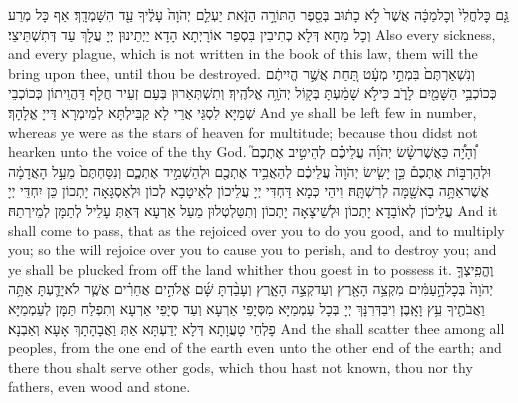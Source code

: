{גַּ֤ם כׇּל\maqqaf חֳלִי֙ וְכׇל\maqqaf מַכָּ֔ה אֲשֶׁר֙ לֹ֣א כָת֔וּב בְּסֵ֖פֶר הַתּוֹרָ֣ה הַזֹּ֑את יַעְלֵ֤ם יְהֹוָה֙ עָלֶ֔יךָ עַ֖ד הִשָּׁמְדָֽךְ׃}
{אַף כָּל מְרַע וְכָל מַחָא דְּלָא כְתִיבִין בִּסְפַר אוֹרָיְתָא הָדָא יַיְתֵינוּן יְיָ עֲלָךְ עַד דְּתִשְׁתֵּיצֵי׃}
{Also every sickness, and every plague, which is not written in the book of this law, them will the \lord\space bring upon thee, until thou be destroyed.}{}
{וְנִשְׁאַרְתֶּם֙ בִּמְתֵ֣י מְעָ֔ט תַּ֚חַת אֲשֶׁ֣ר הֱיִיתֶ֔ם כְּכוֹכְבֵ֥י הַשָּׁמַ֖יִם לָרֹ֑ב כִּי\maqqaf לֹ֣א שָׁמַ֔עְתָּ בְּק֖וֹל יְהֹוָ֥ה אֱלֹהֶֽיךָ׃}
{וְתִשְׁתְּאַרוּן בְּעַם זְעֵיר חֲלָף דַּהֲוֵיתוֹן כְּכוֹכְבֵי שְׁמַיָּא לִסְגֵּי אֲרֵי לָא קַבֵּילְתָּא לְמֵימְרָא דַּייָ אֱלָהָךְ׃}
{And ye shall be left few in number, whereas ye were as the stars of heaven for multitude; because thou didst not hearken unto the voice of the \lord\space thy God.}{}
{וְ֠הָיָ֠ה כַּאֲשֶׁר\maqqaf שָׂ֨שׂ יְהֹוָ֜ה עֲלֵיכֶ֗ם לְהֵיטִ֣יב אֶתְכֶם֮ וּלְהַרְבּ֣וֹת אֶתְכֶם֒ כֵּ֣ן יָשִׂ֤ישׂ יְהֹוָה֙ עֲלֵיכֶ֔ם לְהַאֲבִ֥יד אֶתְכֶ֖ם וּלְהַשְׁמִ֣יד אֶתְכֶ֑ם וְנִסַּחְתֶּם֙ מֵעַ֣ל הָאֲדָמָ֔ה אֲשֶׁר\maqqaf אַתָּ֥ה בָא\maqqaf שָׁ֖מָּה לְרִשְׁתָּֽהּ׃}
{וִיהֵי כְּמָא דַּחְדִּי יְיָ עֲלֵיכוֹן לְאֵיטָבָא לְכוֹן וּלְאַסְגָּאָה יָתְכוֹן כֵּן יִחְדֵּי יְיָ עֲלֵיכוֹן לְאוֹבָדָא יָתְכוֹן וּלְשֵׁיצָאָה יָתְכוֹן וְתִטַּלְטְלוּן מֵעַל אַרְעָא דְּאַתְּ עָלֵיל לְתַמָּן לְמֵירְתַהּ׃}
{And it shall come to pass, that as the \lord\space rejoiced over you to do you good, and to multiply you; so the \lord\space will rejoice over you to cause you to perish, and to destroy you; and ye shall be plucked from off the land whither thou goest in to possess it.}{}
{וֶהֱפִֽיצְךָ֤ יְהֹוָה֙ בְּכׇל\maqqaf הָ֣עַמִּ֔ים מִקְצֵ֥ה הָאָ֖רֶץ וְעַד\maqqaf קְצֵ֣ה הָאָ֑רֶץ וְעָבַ֨דְתָּ שָּׁ֜ם אֱלֹהִ֣ים אֲחֵרִ֗ים אֲשֶׁ֧ר לֹא\maqqaf יָדַ֛עְתָּ אַתָּ֥ה וַאֲבֹתֶ֖יךָ עֵ֥ץ וָאָֽבֶן׃}
{וִיבַדְּרִנָּךְ יְיָ בְּכָל עַמְמַיָּא מִסְּיָפֵי אַרְעָא וְעַד סְיָפֵי אַרְעָא וְתִפְלַח תַּמָּן לְעַמְמַיָּא פָלְחֵי טָעֲוָתָא דְּלָא יְדַעְתָּא אַתְּ וַאֲבָהָתָךְ אָעָא וְאַבְנָא׃}
{And the \lord\space shall scatter thee among all peoples, from the one end of the earth even unto the other end of the earth; and there thou shalt serve other gods, which thou hast not known, thou nor thy fathers, even wood and stone.}{}

